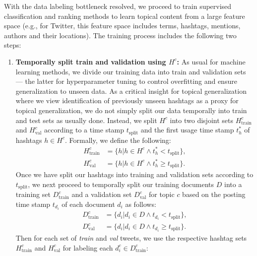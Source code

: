 With the data labeling bottleneck resolved, we proceed to train
supervised classification and ranking methods to learn topical content
from a large feature space (e.g., for Twitter, this feature space
includes terms, hashtags, mentions, authors and their locations). The
training process includes the following two steps:
\begin{enumerate}
\item {\bf Temporally split train and validation using $H^c$:}
As usual for machine learning methods, we divide our training data into
train and validation sets --- the latter for hyperparameter tuning to control
overfitting and ensure generalization to unseen data.  
As a critical insight for topical generalization where we view identification
of previously unseen hashtags as a proxy for topical generalization, we do not simply
split our data temporally into train and test sets as usually done.  Instead,
we split $H^c$ into two disjoint sets $H^c_\mathrm{train}$ and $H^c_\mathrm{val}$ 
according to a time stamp $t_\mathrm{split}$ and the first usage time stamp 
$t_h^\mathrm{*}$ of hashtags $h \in H^c$.
 Formally, we define the following:
\begin{align*}
H^c_\mathrm{train} & = \{ h | h \in H^c \land t_{h}^* <    t_\mathrm{split} \} ,  \\
H^c_\mathrm{val}   & = \{ h | h \in H^c \land t_{h}^{*} \geq t_\mathrm{split} \} .
\end{align*}
Once we have split our hashtags into training and validation sets
according to $t_\mathrm{split}$, we next proceed to temporally split
our training documents $D$ into a training set $D^c_\mathrm{train}$ and a validation set
$D^c_\mathrm{val}$ for topic $c$ based on the posting
time stamp $t_{d_i}$ of each document $d_i$ as follows: 
\begin{align*}
D^c_\mathrm{train} & = \{ d_i | d_i \in D \land t_{d_i} <    t_\mathrm{split} \} ,  \\
D^c_\mathrm{val}   & = \{ d_i | d_i \in D \land t_{d_i} \geq t_\mathrm{split} \} .
\end{align*}
Then for each set of \emph{train} and \emph{val} tweets, we use the respective
hashtag sets $H^c_\mathrm{train}$ and $H^c_\mathrm{val}$ for labeling each $d_{i}^{c} \in D^c_\mathrm{train}$:
\begin{align*}

\end{align*}
\end{enumerate}
